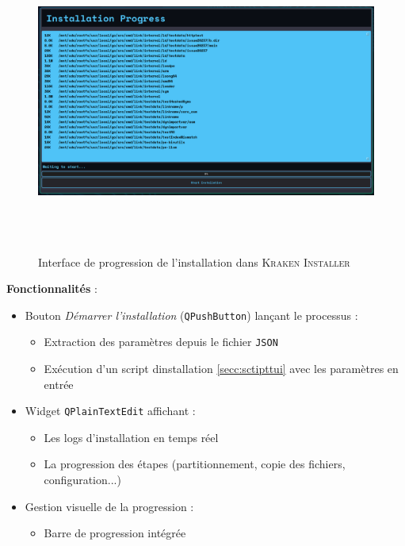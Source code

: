 \begin{figure}[H]
  \centering
  \includegraphics[width=1\textwidth, height=10cm]{images_pfe/installation.png}
  \caption{Interface de progression de l'installation dans \textsc{Kraken Installer}}
  \label{fig:install-page}
\end{figure}

\textbf{Fonctionnalités} :
\begin{itemize}
    \item Bouton \textit{Démarrer l'installation} (\texttt{QPushButton}) lançant le processus :
    \begin{itemize}
        \item Extraction des paramètres  depuis le fichier \texttt{JSON}
        \item Exécution d'un script dinstallation  \textcolor{blue}{\ref{secc:sctipttui}}   avec les paramètres en entrée
    \end{itemize}
    
    \item Widget \texttt{QPlainTextEdit} affichant :
    \begin{itemize}
        \item Les logs d'installation en temps réel
        \item La progression des étapes (partitionnement, copie des fichiers, configuration...)
        
    \end{itemize}
    
    \item Gestion visuelle de la progression :
    \begin{itemize}
        \item Barre de progression intégrée 
       
    \end{itemize}
\end{itemize}




